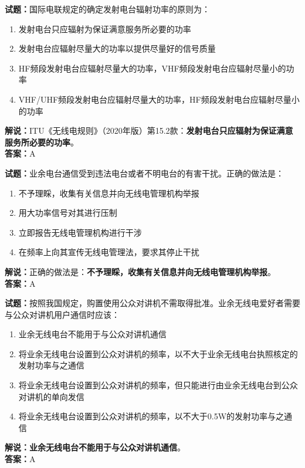 \documentclass{ctexbook}
\begin{document}
\vspace{\baselineskip}

\noindent\textbf{试题：}国际电联规定的确定发射电台辐射功率的原则为：
\begin{enumerate}[leftmargin=3em]
  \item 发射电台只应辐射为保证满意服务所必要的功率
  \item 发射电台应辐射尽量大的功率以提供尽量好的信号质量
  \item HF频段发射电台应辐射尽量大的功率，VHF频段发射电台应辐射尽量小的功率
  \item VHF/UHF频段发射电台应辐射尽量大的功率，HF频段发射电台应辐射尽量小的功率
\end{enumerate}
\noindent\textbf{解说：}ITU《无线电规则》（2020年版）第15.2款：\textbf{发射电台只应辐射为保证满意服务所必要的功率}。\\\noindent\textbf{答案：}A

\vspace{\baselineskip}

\noindent\textbf{试题：}业余电台通信受到违法电台或者不明电台的有害干扰。正确的做法是：
\begin{enumerate}[leftmargin=3em]
  \item 不予理睬，收集有关信息并向无线电管理机构举报
  \item 用大功率信号对其进行压制
  \item 立即报告无线电管理机构进行干涉
  \item 在频率上向其宣传无线电管理法，要求其停止干扰
\end{enumerate}
\noindent\textbf{解说：}正确的做法是：\textbf{不予理睬，收集有关信息并向无线电管理机构举报}。\\\noindent\textbf{答案：}A

\vspace{\baselineskip}

\noindent\textbf{试题：}按照我国规定，购置使用公众对讲机不需取得批准。业余无线电爱好者需要与公众对讲机用户通信时应该：
\begin{enumerate}[leftmargin=3em]
  \item 业余无线电台不能用于与公众对讲机通信
  \item 将业余无线电台设置到公众对讲机的频率，以不大于业余无线电台执照核定的发射功率与之通信
  \item 将业余无线电台设置到公众对讲机的频率，但只能进行由业余无线电台到公众对讲机的单向发信
  \item 将业余无线电台设置到公众对讲机的频率，以不大于0.5W的发射功率与之通信
\end{enumerate}
\noindent\textbf{解说：}\textbf{业余无线电台不能用于与公众对讲机通信}。\\\noindent\textbf{答案：}A
\end{document}
